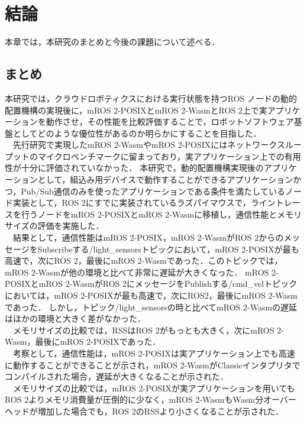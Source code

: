 \chapter{結論}
本章では，本研究のまとめと今後の課題について述べる．
\section{まとめ}
本研究では，クラウドロボティクスにおける実行状態を持つROS ノードの動的配置機構の実現後に，mROS 2-POSIXとmROS 2-WasmとROS 2上で実アプリケーションを動作させ，その性能を比較評価することで，ロボットソフトウェア基盤としてどのような優位性があるのか明らかにすることを目指した．
\\　先行研究で実現したmROS 2-WasmやmROS 2-POSIXにはネットワークスループットのマイクロベンチマークに留まっており，実アプリケーション上での有用性が十分に評価されていなかった．
本研究で，動的配置機構実現後のアプリケーションとして，組込み用デバイスで動作することができるアプリケーションかつ，Pub/Sub通信のみを使ったアプリケーションである条件を満たしているノード実装として，ROS 2にすでに実装されているラズパイマウスで，ライントレースを行うノードをmROS 2-POSIXとmROS 2-Wasmに移植し，通信性能とメモリサイズの評価を実施した．
\\　結果として，通信性能はmROS 2-POSIX，mROS 2-WasmがROS 2からのメッセージをSubscribeする/light\_sensorsトピックにおいて，mROS 2-POSIXが最も高速で，次にROS 2，最後にmROS 2-Wasmであった．このトピックでは，mROS 2-Wasmが他の環境と比べて非常に遅延が大きくなった．
mROS 2-POSIXとmROS 2-WasmがROS 2にメッセージをPublishする/cmd\_velトピックにおいては，mROS 2-POSIXが最も高速で，次にROS2，最後にmROS 2-Wasmであった．
しかし，トピック/light\_sensorsの時と比べてmROS 2-Wasmの遅延はほかの環境と大きく差がなかった．
\\　メモリサイズの比較では，RSSはROS 2がもっとも大きく，次にmROS 2-Wasm，最後にmROS 2-POSIXであった．
\\　考察として，通信性能は，mROS 2-POSIXは実アプリケーション上でも高速に動作することができることが示され，mROS 2-WasmがClassicインタプリタでコンパイルされた場合，遅延が大きくなることが示された．
\\　メモリサイズの比較では，mROS 2-POSIXが実アプリケーションを用いてもROS 2よりメモリ消費量が圧倒的に少なく，mROS 2-WasmもWasm分オーバーヘッドが増加した場合でも，ROS 2のRSSより小さくなることが示された．

